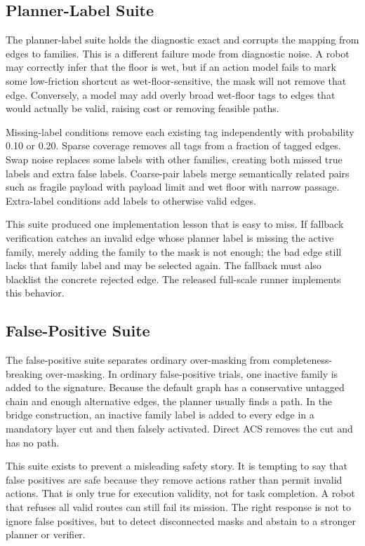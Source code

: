 \documentclass{article}
\newcommand{\ACS}{\textsc{ACS}}
\begin{document}
\subsection{Planner-Label Suite}

The planner-label suite holds the diagnostic exact and corrupts the mapping from edges to families. This is a different failure mode from diagnostic noise. A robot may correctly infer that the floor is wet, but if an action model fails to mark some low-friction shortcut as wet-floor-sensitive, the mask will not remove that edge. Conversely, a model may add overly broad wet-floor tags to edges that would actually be valid, raising cost or removing feasible paths.

Missing-label conditions remove each existing tag independently with probability 0.10 or 0.20. Sparse coverage removes all tags from a fraction of tagged edges. Swap noise replaces some labels with other families, creating both missed true labels and extra false labels. Coarse-pair labels merge semantically related pairs such as fragile payload with payload limit and wet floor with narrow passage. Extra-label conditions add labels to otherwise valid edges.

This suite produced one implementation lesson that is easy to miss. If fallback verification catches an invalid edge whose planner label is missing the active family, merely adding the family to the mask is not enough; the bad edge still lacks that family label and may be selected again. The fallback must also blacklist the concrete rejected edge. The released full-scale runner implements this behavior.

\subsection{False-Positive Suite}

The false-positive suite separates ordinary over-masking from completeness-breaking over-masking. In ordinary false-positive trials, one inactive family is added to the signature. Because the default graph has a conservative untagged chain and enough alternative edges, the planner usually finds a path. In the bridge construction, an inactive family label is added to every edge in a mandatory layer cut and then falsely activated. Direct \ACS{} removes the cut and has no path.

This suite exists to prevent a misleading safety story. It is tempting to say that false positives are safe because they remove actions rather than permit invalid actions. That is only true for execution validity, not for task completion. A robot that refuses all valid routes can still fail its mission. The right response is not to ignore false positives, but to detect disconnected masks and abstain to a stronger planner or verifier.
\end{document}
